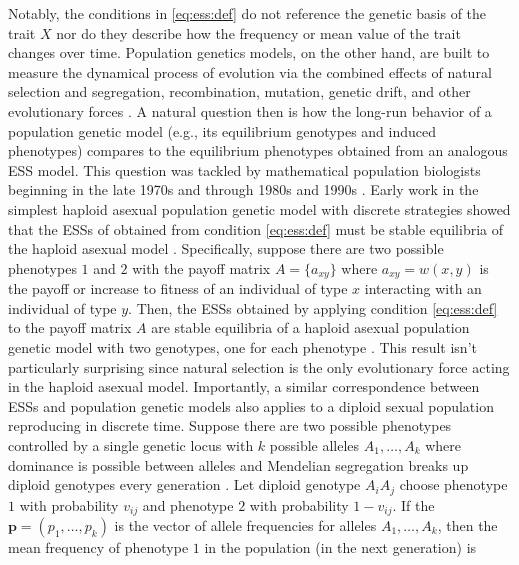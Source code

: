 \documentclass[11pt]{article}
\newcommand{\w}{w}
\renewcommand{\vec}[1]{\mathbf{#1}}
\begin{document}
Notably, the conditions in \eqref{eq:ess:def} do not reference the genetic basis of the trait $X$ nor do they describe how the frequency or mean value of the trait changes over time. Population genetics models, on the other hand, are built to measure the dynamical process of evolution via the combined effects of natural selection and segregation, recombination, mutation, genetic drift, and other evolutionary forces \cite{Crow:Kimura:1970,Ewens:2004}. A natural question then is how the long-run behavior of a population genetic model (e.g., its equilibrium genotypes and induced phenotypes) compares to the equilibrium phenotypes obtained from an analogous ESS model. This question was tackled by mathematical population biologists beginning in the late 1970s and through 1980s and 1990s \cite[e..g,][]{Taylor:Jonker:1978,Hofbauer:Schuster:1979,Zeeman:1980,Eshel:1982,Hofbauer:Schuster:1982,Lessard:1984,Cressman:1988,Cressman:Hines:1984,Cressman:Hofbauer:1996,Hammerstein:1996,Weissing:1996,Eshel:1996,Eshel:Feldman:1984}. Early work in the simplest haploid asexual population genetic model with discrete strategies showed that the ESSs of obtained from condition \eqref{eq:ess:def} must be stable equilibria of the haploid asexual model \cite{Taylor:Jonker:1978,Hofbauer:Schuster:1979,Zeeman:1980}. Specifically, suppose there are two possible phenotypes $1$ and $2$ with the payoff matrix $A = \{a_{xy}\}$ where $a_{xy} = \w(x,y)$ is the payoff or increase to fitness of an individual of type $x$ interacting with an individual of type $y$. Then, the ESSs obtained by applying condition \eqref{eq:ess:def} to the payoff matrix $A$ are stable equilibria of a haploid asexual population genetic model with two genotypes, one for each phenotype \cite{Taylor:Jonker:1978,Hofbauer:Schuster:1979,Zeeman:1980,Hofbauer:Sigmund:1998}. This result isn't particularly surprising since natural selection is the only evolutionary force acting in the haploid asexual model. Importantly, a similar  correspondence between ESSs and population genetic models also applies to a diploid sexual population reproducing in discrete time. Suppose there are two possible phenotypes controlled by a single genetic locus with $k$ possible alleles $A_{1},\ldots,A_{k}$ where dominance is possible between alleles and Mendelian segregation breaks up diploid genotypes every generation \cite{Eshel:1982,Lessard:1984}. Let diploid genotype $A_{i} A_{j}$ choose phenotype $1$ with probability $v_{ij}$ and phenotype $2$ with probability $1-v_{ij}$. If the $\vec{p} = (p_{1}, \ldots, p_{k})$ is the vector of allele frequencies for alleles $A_{1},\ldots,A_{k}$, then the mean frequency of phenotype $1$ in the population (in the next generation) is
\end{document}

